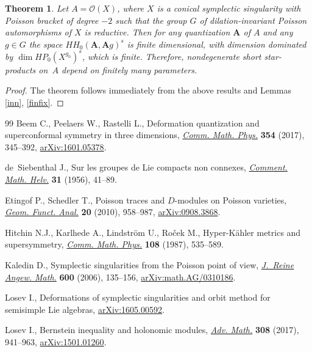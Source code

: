 \documentclass[11pt]{article}
\numberwithin{equation}{section}
\numberwithin{equation}{section}
\newtheorem{Theorem}{Theorem}[section]
\begin{document}
\begin{Theorem}\label{finde3} Let $A=\mathcal{O}(X)$, where $X$ is a conical symplectic singularity
with Poisson bracket of degree $-2$ such that the group $G$ of dilation-invariant Poisson automorphisms of $X$ is reductive. Then for any quantization ${\mathbf A}$ of $A$ and any $g\in G$ the space $HH_0({\mathbf A},{\mathbf A}g)^s$ is finite dimensional, with dimension dominated by $\dim HP_0(X^{g_0})^s$, which is finite. Therefore, nondegenerate short star-products on~$A$ depend on finitely many parameters.
\end{Theorem}

\begin{proof}The theorem follows immediately from the above results and Lemmas \ref{inn}, \ref{finfix}.
\end{proof}
\begin{thebibliography}{99}
Beem C., Peelaers W., Rastelli L., Deformation quantization and superconformal
 symmetry in three dimensions, \href{https://doi.org/10.1007/s00220-017-2845-6}{\textit{Comm. Math. Phys.}} \textbf{354} (2017),
 345--392, \href{https://arxiv.org/abs/1601.05378}{arXiv:1601.05378}.

de~Siebenthal J., Sur les groupes de {L}ie compacts non connexes,
 \href{https://doi.org/10.1007/BF02564352}{\textit{Comment. Math. Helv.}} \textbf{31} (1956), 41--89.

Etingof P., Schedler T., Poisson traces and {$D$}-modules on {P}oisson
 varieties, \href{https://doi.org/10.1007/s00039-010-0085-4}{\textit{Geom. Funct. Anal.}} \textbf{20} (2010), 958--987, \href{https://arxiv.org/abs/0908.3868}{arXiv:0908.3868}.

Hitchin N.J., Karlhede A., Lindstr\"om U., Ro\v{c}ek M., Hyper-{K}\"{a}hler
 metrics and supersymmetry, \href{https://doi.org/10.1007/BF01214418}{\textit{Comm. Math. Phys.}} \textbf{108} (1987), 535--589.

Kaledin D., Symplectic singularities from the {P}oisson point of view,
 \href{https://doi.org/10.1515/CRELLE.2006.089}{\textit{J.~Reine Angew. Math.}} \textbf{600} (2006), 135--156,
 \href{https://arxiv.org/abs/math.AG/0310186}{arXiv:math.AG/0310186}.

Losev I., Deformations of symplectic singularities and orbit method for
 semisimple {L}ie algebras, \href{https://arxiv.org/abs/1605.00592}{arXiv:1605.00592}.

Losev I., Bernstein inequality and holonomic modules, \href{https://doi.org/10.1016/j.aim.2016.12.033}{\textit{Adv. Math.}}
 \textbf{308} (2017), 941--963, \href{https://arxiv.org/abs/1501.01260}{arXiv:1501.01260}.


\end{thebibliography}
\end{document}

